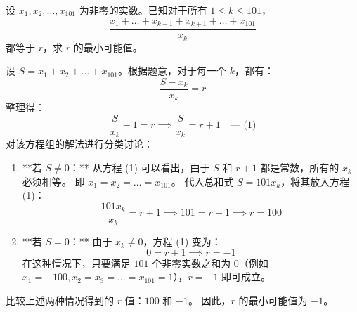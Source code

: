 \begin{questions}
\question 设 $x_1, x_2, \dots, x_{101}$ 为非零的实数。已知对于所有 $1 \le k \le 101$，
\[
\frac{x_1 + \dots + x_{k-1} + x_{k+1} + \dots + x_{101}}{x_k}
\]
都等于 $r$，求 $r$ 的最小可能值。

\begin{solution}
设 $S = x_1 + x_2 + \dots + x_{101}$。根据题意，对于每一个 $k$，都有：
\[
\frac{S - x_k}{x_k} = r
\]
整理得：
\[
\frac{S}{x_k} - 1 = r \implies \frac{S}{x_k} = r + 1 \quad \text{--- (1)}
\]
对该方程组的解法进行分类讨论：

\begin{enumerate}
    \item **若 $S \neq 0$：**
    从方程 (1) 可以看出，由于 $S$ 和 $r+1$ 都是常数，所有的 $x_k$ 必须相等。
    即 $x_1 = x_2 = \dots = x_{101}$。
    代入总和式 $S = 101x_k$，将其放入方程 (1)：
    \[
    \frac{101x_k}{x_k} = r + 1 \implies 101 = r + 1 \implies r = 100
    \]

    \item **若 $S = 0$：**
    由于 $x_k \neq 0$，方程 (1) 变为：
    \[
    0 = r + 1 \implies r = -1
    \]
    在这种情况下，只要满足 $101$ 个非零实数之和为 $0$（例如 $x_1 = -100, x_2 = x_3 = \dots = x_{101} = 1$），$r = -1$ 即可成立。
\end{enumerate}

比较上述两种情况得到的 $r$ 值：$100$ 和 $-1$。
因此，$r$ 的最小可能值为 $-1$。


\end{solution}
\end{questions}
